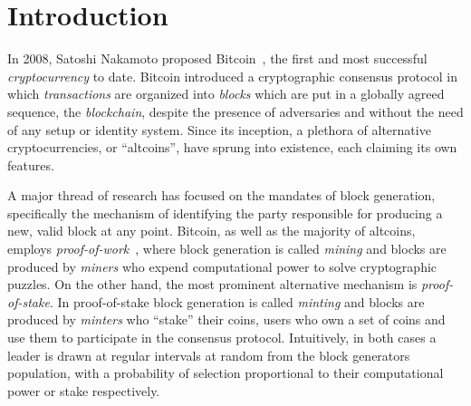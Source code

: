 
\section{Introduction}

In 2008, Satoshi Nakamoto proposed Bitcoin~\cite{bitcoin}, the first and most
successful \emph{cryptocurrency} to date. Bitcoin introduced a cryptographic
consensus protocol in which \emph{transactions} are organized into
\emph{blocks} which are put in a globally agreed sequence, the
\emph{blockchain}, despite the presence of adversaries and without the need of
any setup or identity system. Since its inception, a plethora of alternative
cryptocurrencies, or ``altcoins'', have sprung into existence, each claiming
its own features.

A major thread of research has focused on the mandates of block generation,
specifically the mechanism of identifying the party responsible for producing a
new, valid block at any point. Bitcoin, as well as the majority of altcoins,
employs \emph{proof-of-work}~\cite{C:DwoNao92}, where block generation is
called \emph{mining} and blocks are produced by \emph{miners} who expend
computational power to solve cryptographic puzzles. On the other hand, the most
prominent alternative mechanism is \emph{proof-of-stake}. In proof-of-stake
block generation is called \emph{minting} and blocks are produced by
\emph{minters} who ``stake'' their coins, \ie users who own a set of coins and
use them to participate in the consensus protocol. Intuitively, in both cases a
leader is drawn at regular intervals at random from the block generators
population, with a probability of selection proportional to their computational
power or stake respectively.

